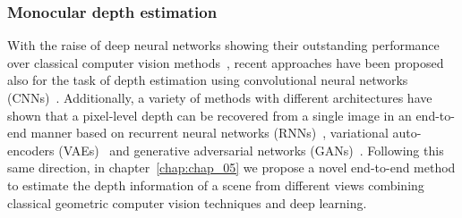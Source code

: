 \subsubsection{Monocular depth estimation}

With the raise of deep neural networks showing their outstanding performance over classical computer vision methods~\cite{He_2017_ICCV, RonnebergerFB15}, recent approaches have been proposed also for the task of depth estimation using convolutional neural networks (CNNs)~\cite{GargBR16}. Additionally, a variety of methods with different architectures have shown that a pixel-level depth can be recovered from a single image in an end-to-end manner based on recurrent neural networks (RNNs)~\cite{abs-1904-07087}, variational auto-encoders (VAEs)~\cite{abs-1902-02086} and generative adversarial networks (GANs)~\cite{aleotti2019}. Following this same direction, in chapter~\ref{chap:chap_05} we propose a novel end-to-end method to estimate the depth information of a scene from different views combining classical geometric computer vision techniques and deep learning.



